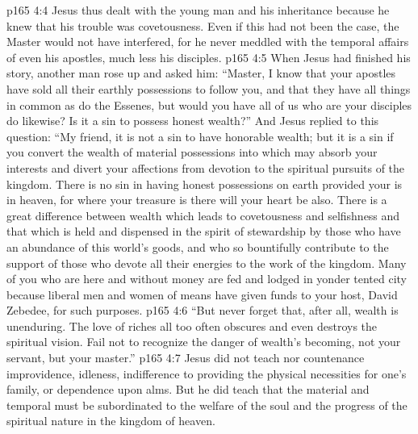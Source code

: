 \vs p165 4:4 \pc Jesus thus dealt with the young man and his inheritance because he knew that his trouble was covetousness. Even if this had not been the case, the Master would not have interfered, for he never meddled with the temporal affairs of even his apostles, much less his disciples.
\vs p165 4:5 When Jesus had finished his story, another man rose up and asked him: “Master, I know that your apostles have sold all their earthly possessions to follow you, and that they have all things in common as do the Essenes, but would you have all of us who are your disciples do likewise? Is it a sin to possess honest wealth?” And Jesus replied to this question: \textcolor{ubdarkred}{“My friend, it is not a sin to have honorable wealth; but it is a sin if you convert the wealth of material possessions into  which may absorb your interests and divert your affections from devotion to the spiritual pursuits of the kingdom. There is no sin in having honest possessions on earth provided your  is in heaven, for where your treasure is there will your heart be also. There is a great difference between wealth which leads to covetousness and selfishness and that which is held and dispensed in the spirit of stewardship by those who have an abundance of this world’s goods, and who so bountifully contribute to the support of those who devote all their energies to the work of the kingdom. Many of you who are here and without money are fed and lodged in yonder tented city because liberal men and women of means have given funds to your host, David Zebedee, for such purposes.}
\vs p165 4:6 \textcolor{ubdarkred}{“But never forget that, after all, wealth is unenduring. The love of riches all too often obscures and even destroys the spiritual vision. Fail not to recognize the danger of wealth’s becoming, not your servant, but your master.”}
\vs p165 4:7 \pc Jesus did not teach nor countenance improvidence, idleness, indifference to providing the physical necessities for one’s family, or dependence upon alms. But he did teach that the material and temporal must be subordinated to the welfare of the soul and the progress of the spiritual nature in the kingdom of heaven.
